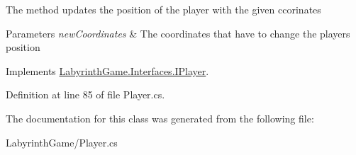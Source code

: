 The method updates the position of the player with the given ccorinates 


\begin{DoxyParams}{Parameters}
{\em new\+Coordinates} & The coordinates that have to change the players position\\
\hline
\end{DoxyParams}


Implements \hyperlink{interface_labyrinth_game_1_1_interfaces_1_1_i_player}{Labyrinth\+Game.\+Interfaces.\+I\+Player}.



Definition at line 85 of file Player.\+cs.



The documentation for this class was generated from the following file\+:\begin{DoxyCompactItemize}
\item 
Labyrinth\+Game/Player.\+cs\end{DoxyCompactItemize}
